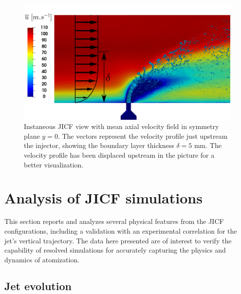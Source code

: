 \begin{figure}[ht]
\centering
\includegraphics[scale=0.2]{./part2_developments/figures_ch5_resolved_JICF/Umean_profile_with_jet_in_BL}
\caption[Instaneous JICF view with mean axial velocity field in symmetry plane $y = 0$]{Instaneous JICF view with mean axial velocity field in symmetry plane $y = 0$. The vectors represent the velocity profile just upstream the injector, showing the boundary layer thickness $\delta = 5$ mm. The velocity profile has been displaced upstream in the picture for a better visualization.}
\label{fig:Umean_profile_with_jet}
\end{figure}



\clearpage

\section{Analysis of JICF simulations}
\label{sec:ch5_JICF_simus_analysis}

This section reports and analyzes several physical features from the JICF configurations, including a validation with an experimental correlation for the jet's vertical trajectory. The data here presented are of interest to verify the capability of resolved simulations for accurately capturing the physics and dynamics of atomization.

\subsection{Jet evolution}
\label{subsec:ch5_jet_evolution}




